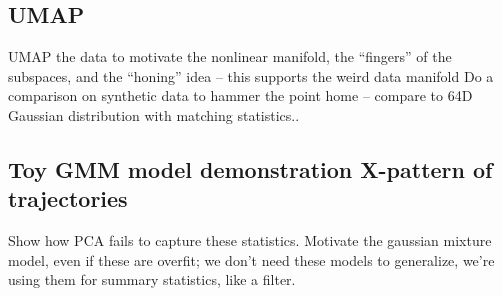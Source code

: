 \documentclass[../main.tex]{subfiles}
\begin{document}










\subsection{UMAP}

UMAP the data to motivate the nonlinear manifold, the “fingers” of the subspaces, and the “honing” idea – this supports the weird data manifold
Do a comparison on synthetic data to hammer the point home – compare to 64D Gaussian distribution with matching statistics..

\subsection{Toy GMM model demonstration X-pattern of trajectories}

Show how PCA fails to capture these statistics. Motivate the gaussian mixture model, even if these are overfit; we don't need these models to generalize, we're using them for summary statistics, like a filter.
\end{document}
